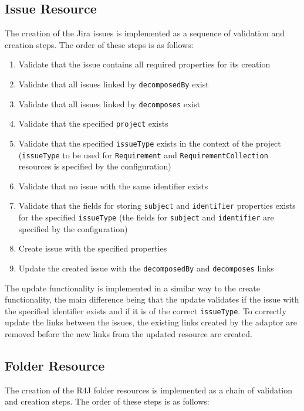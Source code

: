 \subsection*{Issue Resource}
The creation of the Jira issues is implemented as a sequence of validation and creation steps. The order of these steps is as follows:

\begin{enumerate}
  \item Validate that the issue contains all required properties for its creation
  \item Validate that all issues linked by \texttt{decomposedBy} exist
  \item Validate that all issues linked by \texttt{decomposes} exist
  \item Validate that the specified \texttt{project} exists
  \item Validate that the specified \texttt{issueType} exists in the context of the project (\texttt{issueType} to be used for \texttt{Requirement} and \texttt{RequirementCollection} resources is specified by the configuration)
  \item Validate that no issue with the same identifier exists
  \item Validate that the fields for storing \texttt{subject} and \texttt{identifier} properties exists for the specified \texttt{issueType} (the fields for \texttt{subject} and \texttt{identifier} are specified by the configuration)
  \item Create issue with the specified properties
  \item Update the created issue with the \texttt{decomposedBy} and \texttt{decomposes} links
\end{enumerate}

The update functionality is implemented in a similar way to the create functionality, the main difference being that the update validates if the issue with the specified identifier exists and if it is of the correct \texttt{issueType}. To correctly update the links between the issues, the existing links created by the adaptor are removed before the new links from the updated resource are created.

\subsection*{Folder Resource}
The creation of the R4J folder resources is implemented as a chain of validation and creation steps. The order of these steps is as follows:

